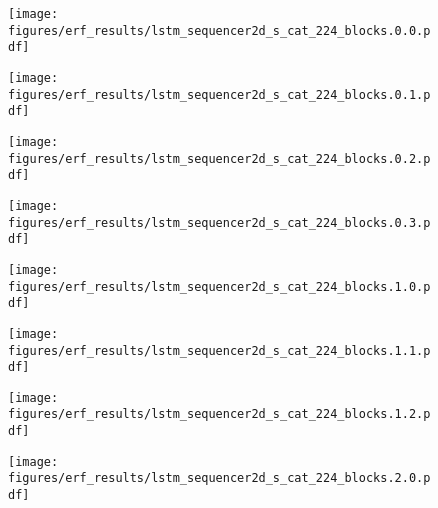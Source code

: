 \documentclass{article}
\begin{document}
\begin{figure}[tb]
  \raggedright
  \begin{minipage}[t]{0.13\hsize}
    \centering
    \texttt{[image: figures/erf\_results/lstm\_sequencer2d\_s\_cat\_224\_blocks.0.0.pdf]}
    \label{figure:erf_sequencer:0}
  \end{minipage}
  \begin{minipage}[t]{0.13\hsize}
    \centering
    \texttt{[image: figures/erf\_results/lstm\_sequencer2d\_s\_cat\_224\_blocks.0.1.pdf]}
    \label{figure:erf_sequencer:1}
  \end{minipage}
  \begin{minipage}[t]{0.13\hsize}
    \centering
    \texttt{[image: figures/erf\_results/lstm\_sequencer2d\_s\_cat\_224\_blocks.0.2.pdf]}
    \label{figure:erf_sequencer:2}
  \end{minipage}
  \begin{minipage}[t]{0.13\hsize}
    \centering
    \texttt{[image: figures/erf\_results/lstm\_sequencer2d\_s\_cat\_224\_blocks.0.3.pdf]}
    \label{figure:erf_sequencer:3}
  \end{minipage}
  \begin{minipage}[t]{0.13\hsize}
    \centering
    \texttt{[image: figures/erf\_results/lstm\_sequencer2d\_s\_cat\_224\_blocks.1.0.pdf]}
    \label{figure:erf_sequencer:4}
  \end{minipage}
  \begin{minipage}[t]{0.13\hsize}
    \centering
    \texttt{[image: figures/erf\_results/lstm\_sequencer2d\_s\_cat\_224\_blocks.1.1.pdf]}
    \label{figure:erf_sequencer:5}
  \end{minipage}
  \begin{minipage}[t]{0.13\hsize}
    \centering
    \texttt{[image: figures/erf\_results/lstm\_sequencer2d\_s\_cat\_224\_blocks.1.2.pdf]}
    \label{figure:erf_sequencer:6}
  \end{minipage}
  \begin{minipage}[t]{0.13\hsize}
    \centering
    \texttt{[image: figures/erf\_results/lstm\_sequencer2d\_s\_cat\_224\_blocks.2.0.pdf]}
    \label{figure:erf_sequencer:7}
  \end{minipage}
  \begin{minipage}[t]{0.13\hsize}

\end{minipage}
\end{figure}
\end{document}
